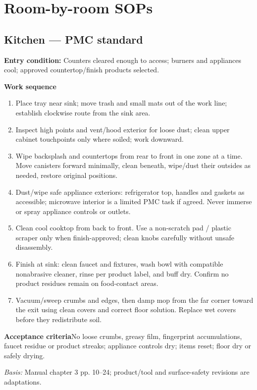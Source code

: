 \documentclass[10pt,letterpaper,oneside]{article}
\newcommand{\subtle}[1]{{\color{graytext}\small #1}}
\newcommand{\sop}[3]{\Needspace{8\baselineskip}\subsection{#1}\subtle{\textbf{Entry condition:} #2}\par\textbf{Work sequence}\begin{enumerate}#3\end{enumerate}}
\newcommand{\accept}[1]{\begin{notebox}\textbf{Acceptance criteria}\quad #1\end{notebox}}
\newcommand{\sources}[1]{\par{\small\color{graytext}\textit{Basis:} #1}\par}
\begin{document}
\section{Room-by-room SOPs}
\sop{Kitchen --- PMC standard}{Counters cleared enough to access; burners and appliances cool; approved countertop/finish products selected.}{
\item Place tray near sink; move trash and small mats out of the work line; establish clockwise route from the sink area.
\item Inspect high points and vent/hood exterior for loose dust; clean upper cabinet touchpoints only where soiled; work downward.
\item Wipe backsplash and countertops from rear to front in one zone at a time. Move canisters forward minimally, clean beneath, wipe/dust their outsides as needed, restore original positions.
\item Dust/wipe safe appliance exteriors: refrigerator top, handles and gaskets as accessible; microwave interior is a limited PMC task if agreed. Never immerse or spray appliance controls or outlets.
\item Clean cool cooktop from back to front. Use a non-scratch pad / plastic scraper only when finish-approved; clean knobs carefully without unsafe disassembly.
\item Finish at sink: clean faucet and fixtures, wash bowl with compatible nonabrasive cleaner, rinse per product label, and buff dry. Confirm no product residues remain on food-contact areas.
\item Vacuum/sweep crumbs and edges, then damp mop from the far corner toward the exit using clean covers and correct floor solution. Replace wet covers before they redistribute soil.}
\accept{No loose crumbs, greasy film, fingerprint accumulations, faucet residue or product streaks; appliance controls dry; items reset; floor dry or safely drying.}
\sources{Manual chapter 3 pp. 10--24; product/tool and surface-safety revisions are adaptations.}
\end{document}
